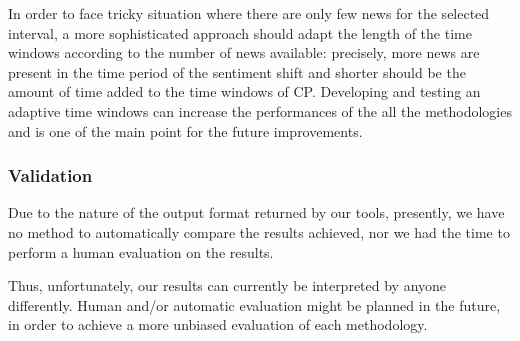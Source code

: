 In order to face tricky situation where there are only few news for the selected interval, a more sophisticated approach should adapt the length of the time windows according to the number of news available:
precisely, more news are present in the time period of the sentiment shift and shorter should be the amount of time added to the time windows of CP.
Developing and testing an adaptive time windows can increase the performances of the all the methodologies and is one of the main point for the future improvements.

\subsubsection*{Validation}
Due to the nature of the output format returned by our tools, presently, we have
no method to automatically compare the results achieved, nor we had the time to
perform a human evaluation on the results.

Thus, unfortunately, our results can currently be interpreted by anyone
differently. Human and/or automatic evaluation might be planned in the future,
in order to achieve a more unbiased evaluation of each methodology.
